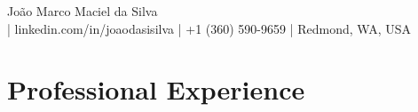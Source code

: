 \documentclass[letterpaper,11pt]{article}
\begin{document}
\begin{center}
{\Large João Marco Maciel da Silva}\\[5pt]
{\footnotesize \EMAIL{} | linkedin.com/in/joaodasisilva | +1 (360) 590-9659 | Redmond, WA, USA}\\[5pt]
\end{center}


\section{Professional Experience}








\end{document}
